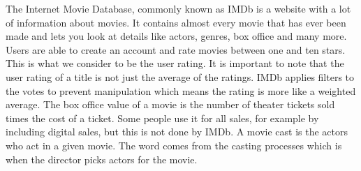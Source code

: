 The Internet Movie Database, commonly known as IMDb is a website with a lot of information about movies. It contains almost every movie that has ever been made and lets you look at details like actors, genres, box office and many more. Users are able to create an account and rate movies between one and ten stars. This is what we consider to be the user rating. It is important to note that the user rating of a title is not just the average of the ratings. IMDb applies filters\cite{IMDbFilters} to the votes to prevent manipulation which means the rating is more like a weighted average. The box office value of a movie is the number of theater tickets sold times the cost of a ticket. Some people use it for all sales, for example by including digital sales, but this is not done by IMDb. A movie cast is the actors who act in a given movie. The word comes from the casting processes which is when the director picks actors for the movie.